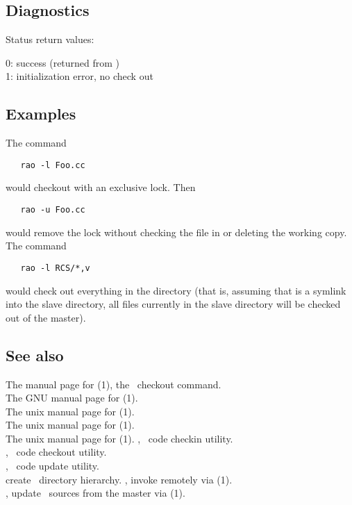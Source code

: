 \subsection*{Diagnostics}
 
Status return values:
\begin{status}
   0:  success (returned from )\\
   1:  initialization error, no check out\\
\end{status}

\subsection*{Examples}
 
The command
 
\begin{verbatim}
   rao -l Foo.cc
\end{verbatim}
 
\noindent
would checkout  with an exclusive lock.  Then
 
\begin{verbatim}
   rao -u Foo.cc
\end{verbatim}
 
\noindent
would remove the lock without checking the file in or deleting the working
copy.  The command
 
\begin{verbatim}
   rao -l RCS/*,v
\end{verbatim}
 
\noindent
would check out everything in the directory (that is, assuming that 
is a symlink into the slave directory, all files currently in the slave
directory will be checked out of the master).
 
\subsection*{See also}
 
The manual page for (1), the \rcs\ checkout command.\\
The GNU manual page for (1).\\
The unix manual page for (1).\\
The unix manual page for (1).\\
The unix manual page for (1).
, \aipspp\ code checkin utility.\\
, \aipspp\ code checkout utility.\\
, \aipspp\ code update utility.\\
 create \aipspp\ directory hierarchy.
, invoke  remotely via (1).\\
, update \aipspp\ sources from the master via (1).\\

